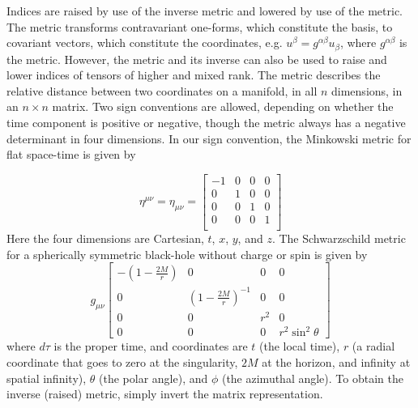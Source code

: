 Indices are raised by use of the inverse metric and lowered by use of the metric. The metric transforms contravariant one-forms, which constitute the basis, to covariant vectors, which constitute the coordinates, e.g. $u^\beta=g^{\alpha\beta}u_\beta$, where $g^{\alpha\beta}$ is the metric. However, the metric and its inverse can also be used to raise and lower indices of tensors of higher and mixed rank. The metric describes the relative distance between two coordinates on a manifold, in all $n$ dimensions, in an $n\times n$ matrix. Two sign conventions are allowed, depending on whether the time component is positive or negative, though the metric always has a negative determinant in four dimensions. In our sign convention, the Minkowski metric for flat space-time is given by


\[
\eta^{\mu\nu}=\eta_{\mu\nu}=
\begin{bmatrix}
  -1 & 0 & 0 & 0\\
  0 & 1 & 0 & 0\\
  0 & 0 & 1 & 0\\
  0 & 0 & 0 & 1\\
\end{bmatrix}
\]
Here the four dimensions are Cartesian, $t$, $x$, $y$, and $z$. The Schwarzschild metric for a spherically symmetric black-hole without charge or spin is given by
\[
g_{\mu\nu}
\begin{bmatrix}
  -(1-\frac{2M}{r}) & 0 & 0 & 0\\
  0 & (1-\frac{2M}{r})^{-1} & 0 &0\\
  0 & 0 & r^2 & 0\\
  0 & 0 & 0 & r^2\sin^2\theta
\end{bmatrix}
\]
where $d\tau$ is the proper time, and coordinates are $t$ (the local time), $r$ (a radial coordinate that goes to zero at the singularity, $2M$ at the horizon, and infinity at spatial infinity), $\theta$ (the polar angle), and $\phi$ (the azimuthal angle). To obtain the inverse (raised) metric, simply invert the matrix representation.



